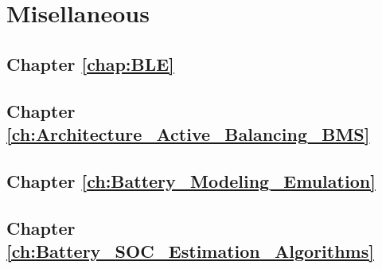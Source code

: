 \chapter{Misellaneous}\label{chap:miselleneous}
\section{Chapter \ref{chap:BLE}}

\section{Chapter \ref{ch:Architecture_Active_Balancing_BMS}}

\section{Chapter \ref{ch:Battery_Modeling_Emulation}}

\section{Chapter \ref{ch:Battery_SOC_Estimation_Algorithms}}
